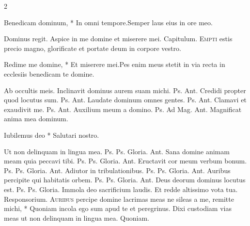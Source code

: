 \begin{multicols*}{2}
\begin{responsory-breve}
{Benedicam dominum, * In omni tempore.}{Semper laus eius in ore meo.}
\end{responsory-breve}%
\V Dominus regit.
 Aspice in me domine et miserere mei. {\color{Red} Capitulum.}
\lettrine[lines=2]{\zallmancaps \color{Red} E}{mpti} estis precio magno, glorificate et portate deum in corpore vestro.
\begin{responsory-breve}
{Redime me domine, * Et miserere mei.}{Pes enim meus stetit in via recta in ecclesiis benedicam te domine.}
\end{responsory-breve}%
\V Ab occultis meis.
 Inclinavit dominus aurem suam michi. {\color{Red} Ps.}  {\color{Red} Ant.} Credidi propter quod locutus sum. {\color{Red} Ps.}  {\color{Red} Ant.} Laudate dominum omnes gentes. {\color{Red} Ps.}  {\color{Red} Ant.} Clamavi et exaudivit me. {\color{Red} Ps.}  {\color{Red} Ant.} Auxilium meum a domino. {\color{Red} Ps.}  {\color{Red} Ad Mag. Ant.} Magnificat anima mea dominum.
{\color{Red} }
\par {}
\begin{invitatory}
{Iubilemus deo * Salutari nostro.}
\end{invitatory}
 Ut non delinquam in lingua mea. {\color{Red} Ps.}  {\color{Red} Ps.}  Gloria. {\color{Red} Ant.} Sana domine animam meam quia peccavi tibi. {\color{Red} Ps.}  {\color{Red} Ps.}  Gloria. {\color{Red} Ant.} Eructavit cor meum verbum bonum. {\color{Red} Ps.}  {\color{Red} Ps.}  Gloria. {\color{Red} Ant.} Adiutor in tribulationibus. {\color{Red} Ps.}  {\color{Red} Ps.}  Gloria. {\color{Red} Ant.} Auribus percipite qui habitatis orbem. {\color{Red} Ps.}  {\color{Red} Ps.}  Gloria. {\color{Red} Ant.} Deus deorum dominus locutus est. {\color{Red} Ps.}  {\color{Red} Ps.}  Gloria. \V Immola deo sacrificium laudis. \R Et redde altissimo vota tua. {\color{Red} Responsorium.}
\lettrine[lines=2]{\zallmancaps \color{Red} A}{uribus} \hypertarget{auribus-percipe}{\label{auribus-percipe}} percipe domine lacrimas meas ne sileas a me, remitte michi, * Quoniam incola ego sum apud te et peregrinus. \V Dixi custodiam vias meas ut non delinquam in lingua mea. Quoniam.

\end{multicols*}
